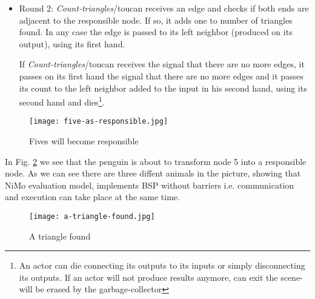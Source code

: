 \documentclass{article}                     \usepackage{graphics}
\begin{document}
\begin{itemize}
\begin{figure}[h]
	\centering
	\texttt{[image: start-counting-for-2.jpg]}
	\caption{Start to check edges for closing triangles}
	\label{stage2}
\end{figure}
\textit{Count-triangles}/toucan will keep the responsible node and all its adjacent ones collected by the corresponding  \textit{Collect-adjacent}/lion  actor and record that no triangles showed up so far as shown in Fig. \ref{stage2} having a third parameter set to $0$. The actors  will have only two hands to shake with its neighbors: one hand to deal with the graph and the second hand to propagate the local triangle count.  

In figure Fig: \ref{stage2} we see the process \textit{Count-triangles}/toucan  prepared to count triangles that include the resposible node (2).

\item Round 2: \textit{Count-triangles}/toucan  receives an edge and checks  if  both ends are adjacent to the responsible node. If so, it adds one to number of triangles found. In any case the edge is passed to its left neighbor (produced on its output), using its first hand. 

If  \textit{Count-triangles}/toucan receives the signal that there are no more edges, it passes on its first hand the signal that there are no more edges and it passes its count to the left neighbor added to the input in his second hand, using its second hand and dies\footnote{An actor can die connecting its outputs to its inputs or simply  disconnecting  its outputs. If an actor will not produce results anymore, can exit the scene-will be erased by the garbage-collector}.
\end{itemize}

 \begin{figure}[h]
	\centering
	\texttt{[image: five-as-responsible.jpg]}
	\caption{Fives  will become responsible}
	\label{stage0.0}
\end{figure}

	In Fig. \ref{stage0.0} we see that the penguin is about to transform node  5 into a responsible node. As we can see there are three diffent animals in the picture, showing that NiMo evaluation model, implements BSP without barriers i.e. communication and execution can take place at the same time.
	
	
\begin{figure}[h]
	\centering
	\texttt{[image: a-triangle-found.jpg]}
	\caption{A  triangle found}
	\label{stage2.1}
\end{figure}
\end{document}

